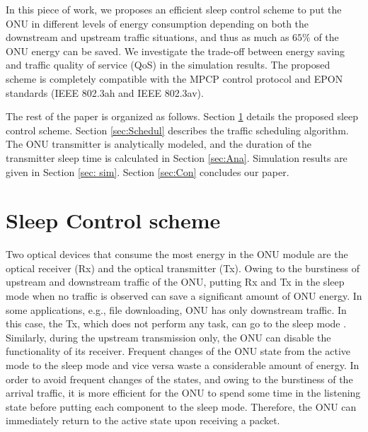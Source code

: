 \documentclass[11pt,english,12pt,onecolumn, draftcls]{IEEEtran}
\theoremstyle{plain}
\theoremstyle{definition}
\begin{document}
In this piece of work, we proposes an efficient sleep control scheme to put the ONU in different levels of energy consumption depending on both the downstream and upstream traffic situations, and thus as much as $65\%$ of the ONU energy can be saved. We investigate the trade-off between energy saving and traffic quality of service (QoS) in the simulation results. The proposed scheme is completely compatible with the MPCP control protocol and EPON standards (IEEE 802.3ah and IEEE 802.3av).


The rest of the paper is organized as follows. Section \ref{sec: Model} details the proposed sleep control scheme. Section \ref{sec:Schedul} describes the traffic scheduling algorithm. The ONU transmitter is analytically modeled, and the duration of the transmitter sleep time is calculated in Section \ref{sec:Ana}. Simulation results are given in Section \ref{sec: sim}. Section \ref{sec:Con} concludes our paper.

\vspace{-0.1in}
\section{Sleep Control scheme}
\label{sec: Model}
Two optical devices that consume the most energy in the ONU module are the optical receiver (Rx) and the optical transmitter (Tx). Owing to the burstiness of upstream and downstream traffic of the ONU, putting Rx and Tx in the sleep mode when no traffic is observed can save a significant amount of ONU energy. In some applications, e.g., file downloading, ONU has only downstream traffic. In this case, the Tx, which does not perform any task, can go to the sleep mode \cite{Mina2013}. Similarly, during the upstream transmission only, the ONU can disable the functionality of its receiver. Frequent changes of the ONU state from the active mode to the sleep mode and vice versa waste a considerable amount of energy. In order to avoid frequent changes of the states, and owing to the burstiness of the arrival traffic, it is more efficient for the ONU to spend some time in the listening state before putting each component to the sleep mode. Therefore, the ONU can immediately return to the active state upon receiving a packet.
\end{document}
